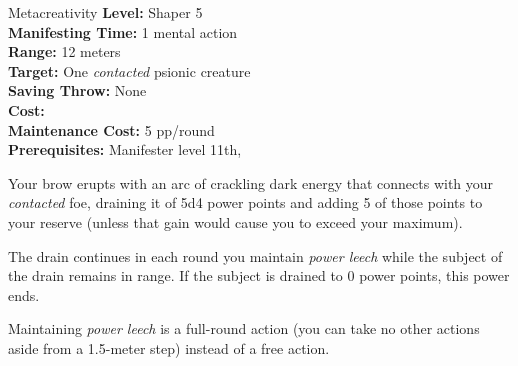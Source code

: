 {Metacreativity}
{
	\textbf{Level:}
	Shaper 5\\
	\textbf{Manifesting Time:}
	1 mental action\\
	\textbf{Range:}
	12 meters\\
	\textbf{Target:}
	One \emph{contacted} psionic creature\\
	\textbf{Saving Throw:}
	None\\
	\textbf{Cost:}
	\\
	\textbf{Maintenance Cost:}
	5 pp/round\\
	\textbf{Prerequisites:}
	Manifester level 11th, \\
}
{
	Your brow erupts with an arc of crackling dark energy that connects with your \emph{contacted} foe, draining it of 5d4 power points and adding 5 of those points to your reserve (unless that gain would cause you to exceed your maximum).

	The drain continues in each round you maintain \emph{power leech} while the subject of the drain remains in range. If the subject is drained to 0 power points, this power ends.

	Maintaining \emph{power leech} is a full-round action (you can take no other actions aside from a 1.5-meter step) instead of a free action.
}